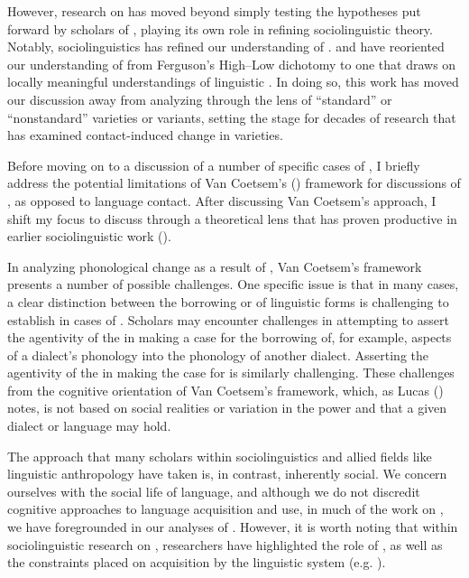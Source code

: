 \documentclass[output=paper]{langsci/langscibook}
\begin{document}
  However, research on  has moved beyond simply testing the hypotheses put forward by scholars of  , playing its own role in refining sociolinguistic theory. Notably,  sociolinguistics has refined our understanding of  \citep{Ferguson1959}. \citet{Ibrahim1986} and \citet{Haeri2000} have reoriented our understanding of   from Ferguson’s High–Low dichotomy to one that draws on locally meaningful understandings of linguistic . In doing so, this work has moved our discussion away from analyzing  through the lens of “standard” or “nonstandard” varieties or variants, setting the stage for decades of research that has examined contact-induced change in  varieties.

Before moving on to a discussion of a number of specific cases of  , I briefly address the potential limitations of Van Coetsem’s (\citeyear{VanCoetsem1988,VanCoetsem2000}) framework for discussions of , as opposed to language contact. After discussing Van Coetsem’s approach, I shift my focus to discuss   through a theoretical lens that has proven productive in earlier sociolinguistic work (\citealt{Trudgill1986,Trudgill2004}). 

  In analyzing phonological change as a result of , Van Coetsem’s framework presents a number of possible challenges. One specific issue is that in many cases, a clear distinction between the borrowing or  of linguistic forms is challenging to establish in cases of  . Scholars may encounter challenges in attempting to assert the agentivity of the  in making a case for the borrowing of, for example, aspects of a dialect’s phonology into the phonology of another dialect. Asserting the agentivity of the  in making the case for  is similarly challenging. These challenges  from the cognitive orientation of Van Coetsem’s framework, which, as Lucas (\citeyear[521]{Lucas2015}) notes, is not based on social realities or variation in the power and  that a given dialect or language may hold. 

  The approach that many scholars within sociolinguistics and allied fields like linguistic anthropology have taken is, in contrast, inherently social. We concern ourselves with the social life of language, and although we do not discredit cognitive approaches to language acquisition and use, in much of the work on , we have foregrounded  in our analyses of . However, it is worth noting that within sociolinguistic research on , researchers have highlighted the role of , as well as the constraints placed on acquisition by the linguistic system (e.g. \citealt{Nycz2013,Nycz2016}).  
\end{document}
